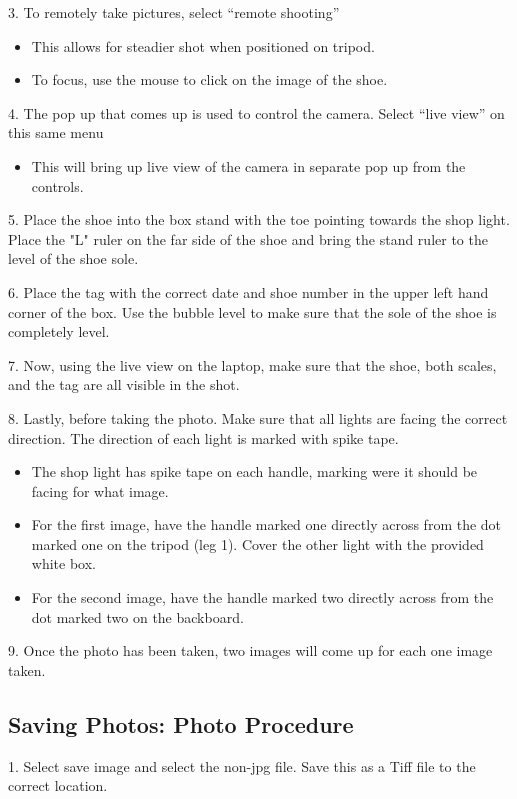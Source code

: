 3. To remotely take pictures, select “remote shooting”
\begin{itemize}
\item This allows for steadier shot when positioned on tripod.
\item To focus, use the mouse to click on the image of the shoe.
\end{itemize}

4. The pop up that comes up is used to control the camera. Select “live view” on this same menu
\begin{itemize}
\item This will bring up live view of the camera in separate pop up from the controls.
\end{itemize}

5. Place the shoe into the box stand with the toe pointing towards the shop light. Place the "L" ruler on the far side of the shoe and bring the stand ruler to the level of the shoe sole. 

6. Place the tag with the correct date and shoe number in the upper left hand corner of the box. Use the bubble level to make sure that the sole of the shoe is completely level.

7. Now, using the live view on the laptop, make sure that the shoe, both scales, and the tag are all visible in the shot.

8. Lastly, before taking the photo. Make sure that all lights are facing the correct direction. The direction of each light is marked with spike tape.
\begin{itemize}
\item The shop light has spike tape on each handle, marking were it should be facing for what image. 
\item For the first image, have the handle marked one directly across from the dot marked one on the tripod (leg 1). Cover the other light with the provided white box. 
\item For the second image, have the handle marked two directly across from the dot marked two on the backboard. 
\end{itemize}

9. Once the photo has been taken, two images will come up for each one image taken. 

\subsection{Saving Photos: Photo Procedure}

1. Select save image and select the non-jpg file. Save this as a Tiff file to the correct location. 


